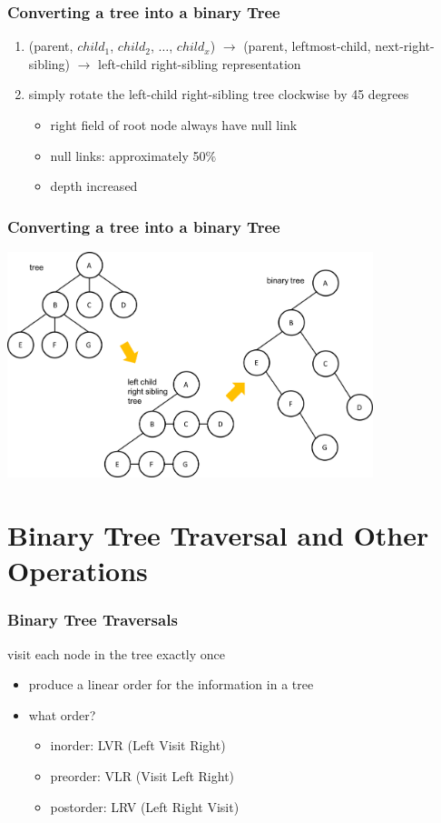 \documentclass[newPxFont,sthlmFooter,nooffset]{beamer}
\begin{document}
\begin{frame}[t]
  \frametitle{Converting a tree into a binary Tree}
  \begin{enumerate}
  \item (parent, $child_1$, $child_2$, $\ldots$, $child_x$) $\rightarrow$ 
        (parent, leftmost-child, next-right-sibling) $\rightarrow$  
        left-child right-sibling representation
   \item simply rotate the left-child right-sibling tree clockwise by 45 degrees
     \begin{itemize}
     \item right field of root node always have null link
     \item null links: approximately 50$\%$
     \item depth increased
     \end{itemize}

  \end{enumerate}
\end{frame}


\begin{frame}[t]
  \frametitle{Converting a tree into a binary Tree}
  \begin{center}
    \includegraphics[width=0.8\textwidth]{figures/fig09_conversion.png}
  \end{center}

\end{frame}


\section{Binary Tree Traversal and Other Operations}
\begin{frame}[t]
  \frametitle{Binary Tree Traversals}
visit each node in the tree exactly once
\begin{itemize}
\item produce a linear order for the information in a tree
\item what order?
  \begin{itemize}
  \item inorder: LVR (Left Visit Right)
  \item preorder: VLR (Visit Left Right)
  \item postorder: LRV (Left Right Visit)
  \end{itemize}
\end{itemize}

\end{frame}
\end{document}
